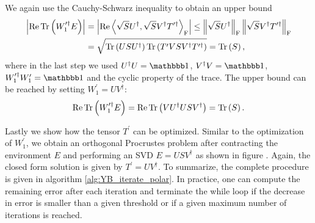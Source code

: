 We again use the Cauchy-Schwarz inequality to obtain an upper bound
\begin{equation}
	\begin{split}
		\left|\operatorname{Re}\operatorname{Tr}\left(W_1^{\prime\dagger}E\right)\right| &= \left|\operatorname{Re}\left\langle\sqrt{S}U^\dagger,\sqrt{S}V^\dagger T^{\prime\dagger}\right\rangle_\text{F}\right| \le \left\lVert\sqrt{S}U^\dagger\right\rVert_\text{F} \left\lVert\sqrt{S}V^\dagger T^{\prime\dagger}\right\rVert_\text{F}\\
		&= \sqrt{\operatorname{Tr}\left(USU^\dagger\right)\operatorname{Tr}\left(T^\prime VSV^\dagger T^{\prime\dagger}\right)} = \operatorname{Tr}\left(S\right),		
	\end{split}
\end{equation}
where in the last step we used $U^\dagger U = \id$, $V^\dagger V = \id$, $W_1^{\prime\dagger}W_1^\prime = \id$ and the cyclic property of the trace. The upper bound can be reached by setting $W_1^\prime = UV^\dagger$:
\begin{equation}
	\operatorname{Re}\operatorname{Tr}\left(W_1^{\prime\dagger}E\right) = \operatorname{Re}\operatorname{Tr}\left(VU^\dagger USV^\dagger\right) = \operatorname{Tr}\left(S\right).
\end{equation}\par
Lastly we show how the tensor $T^\prime$ can be optimized. Similar to the optimization of $W_1^\prime$, we obtain an orthogonal Procrustes problem after contracting the environment $E$ and performing an SVD $E = USV^\dagger$ as shown in figure . Again, the closed form solution is given by $T^\prime = UV^\dagger$. To summarize, the complete procedure is given in algorithm \ref{alg:YB_iterate_polar}. In practice, one can compute the remaining error after each iteration and terminate the while loop if the decrease in error is smaller than a given threshold or if a given maximum number of iterations is reached.
